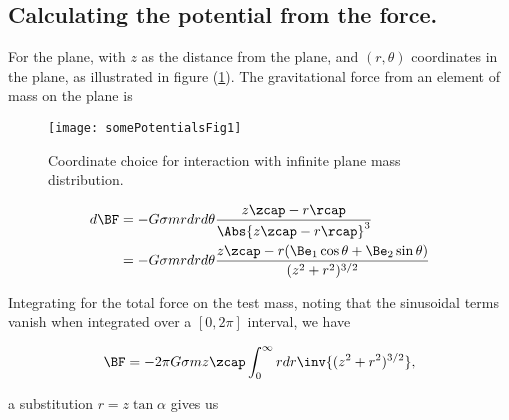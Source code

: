 \subsection{Calculating the potential from the force.}

For the plane, with $z$ as the distance from the plane, and $(r,\theta)$ coordinates in the plane, as illustrated in figure (\ref{fig:classicalMechanicsPs2:somePotentialsFig1}).  The gravitational force from an element of mass on the plane is
\begin{figure}[htp]
   \centering
   \texttt{[image: somePotentialsFig1]}
   \caption{Coordinate choice for interaction with infinite plane mass distribution.}\label{fig:classicalMechanicsPs2:somePotentialsFig1}
\end{figure}

\begin{align*}
d\BF
&= -G \sigma m r dr d\theta \frac{z \zcap - r \rcap}{\Abs{z \zcap - r \rcap}^3 } \\
&= -G \sigma m r dr d\theta \frac{z \zcap - r (\Be_1 \cos\theta + \Be_2 \sin\theta) }{(z^2 + r^2)^{3/2} } \\
\end{align*}

%
%
Integrating for the total force on the test mass, noting that the sinusoidal terms vanish when integrated over a $[0, 2 \pi]$ interval, we have

\begin{equation}\label{eqn:classicalMechanicsPs2:10}
\BF = - 2 \pi G \sigma m z \zcap \int_0^\infty r dr \inv{(z^2 + r^2)^{3/2} },
\end{equation}

a substitution $r = z \tan \alpha$ gives us

